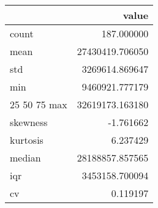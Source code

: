 \begin{tabular}{lr}
\toprule
 & value \\
\midrule
count & 187.000000 \\
mean & 27430419.706050 \\
std & 3269614.869647 \\
min & 9460921.777179 \\
25%
50%
75%
max & 32619173.163180 \\
skewness & -1.761662 \\
kurtosis & 6.237429 \\
median & 28188857.857565 \\
iqr & 3453158.700094 \\
cv & 0.119197 \\
\bottomrule
\end{tabular}
